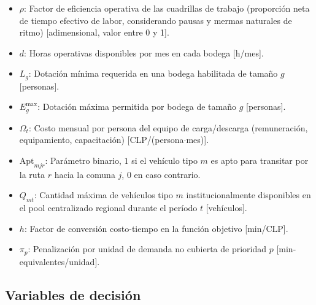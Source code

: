\documentclass[letterpaper]{article}
\begin{document}
\begin{flushleft}
\begin{itemize}[leftmargin=2em, itemsep=1pt]
  \item $\rho$: Factor de eficiencia operativa de las cuadrillas de trabajo (proporción neta de tiempo efectivo de labor, considerando pausas y mermas naturales de ritmo) [adimensional, valor entre 0 y 1].
  \item $d$: Horas operativas disponibles por mes en cada bodega [h/mes].
  \item $L_g$: Dotación mínima requerida en una bodega habilitada de tamaño $g$ [personas].
  \item $E^{\max}_g$: Dotación máxima permitida por bodega de tamaño $g$ [personas].
  \item $\Omega_t$: Costo mensual por persona del equipo de carga/descarga (remuneración, equipamiento, capacitación) [CLP/(persona$\cdot$mes)].
  \item $\mathrm{Apt}_{mjr}$: Parámetro binario, $1$ si el vehículo tipo $m$ es apto para transitar por la ruta $r$ hacia la comuna $j$, $0$ en caso contrario.
  \item $Q_{mt}$: Cantidad máxima de vehículos tipo $m$ institucionalmente disponibles en el pool centralizado regional durante el período $t$ [vehículos].
  \item $h$: Factor de conversión costo-tiempo en la función objetivo [min/CLP].
  \item $\pi_p$: Penalización por unidad de demanda no cubierta de prioridad $p$ [min-equivalentes/unidad].
\end{itemize}

\subsection{Variables de decisión}


\end{flushleft}
\end{document}
